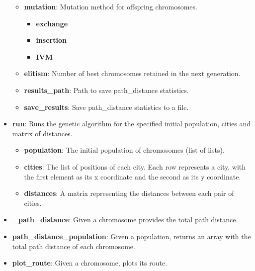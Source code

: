 \documentclass[11pt]{article}
\begin{document}
\begin{itemize}
\begin{itemize}
            \item \textbf{mutation}: Mutation method for offspring chromosomes.
                \begin{itemize}
                    \item \textbf{exchange}
                    \item \textbf{insertion}
                    \item \textbf{IVM}
                \end{itemize}
            \item \textbf{elitism}: Number of best chromosomes retained in the next generation.
            \item \textbf{results\_path}: Path to save path\_distance statistics.
            \item \textbf{save\_results}: Save path\_distance statistics to a file.
        \end{itemize}
    \item \textbf{run}: Runs the genetic algorithm for the specified initial population, cities and matrix of distances.
        \begin{itemize}
            \item \textbf{population}: The initial population of chromosomes (list of lists).
            \item \textbf{cities}: The list of positions of each city. Each row represents a city, with the first element as its x coordinate and the second as its y coordinate.
            \item \textbf{distances}: A matrix representing the distances between each pair of cities.
        \end{itemize}
    \item \textbf{\_path\_distance}: Given a chromosome provides the total path distance.
    \item \textbf{path\_distance\_population}: Given a population, returns an array with the total path distance of each chromosome.
    \item \textbf{plot\_route}: Given a chromosome, plots its route.
\end{itemize}
\end{document}
